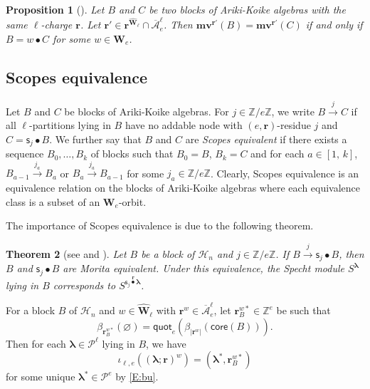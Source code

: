 \documentclass[11pt,a4paper,reqno]{amsart}
\numberwithin{equation}{section}
\theoremstyle{plain}
\newtheorem{thm}{Theorem}[section]
\newtheorem{prop}[thm]{Proposition}
\theoremstyle{definition}
\theoremstyle{remark}
\numberwithin{equation}{section}
\newcommand{\bl}{\boldsymbol{\lambda}}
\newcommand{\br}{\mathbf{r}}
\newcommand{\core}{\mathsf{core}}
\newcommand{\quot}{\mathsf{quot}}
\newcommand{\mv}{\mathbf{mv}}
\newcommand{\ZZ}{\mathbb{Z}}
\newcommand{\cs}{\mathsf{s}}
\newcommand{\HH}{\mathcal{H}}
\newcommand{\PP}{\mathcal{P}}
\newcommand{\EW}{\widehat{\mathbf{W}}}
\newcommand{\AW}{\mathbf{W}}
\newcommand{\DDot}[1]{\mathrel{\overset{#1}{\bullet}}}
\newcommand{\AAbar}{\overline{\mathcal{A}}_e^{\ell}}
\newcommand{\bij}{\iota}
\newcommand{\EP}{\pmb{\varnothing}}
\def\Z{{\mathbb Z}}
\begin{document}
\begin{prop}[{\cite[Proposition 3.13]{LQT}}] \label{P:moving-vector-Weyl-orbit}
Let $B$ and $C$ be two blocks of Ariki-Koike algebras with the same $\ell$-charge $\br$.
Let $\br' \in \br^{\EW_{\ell}} \cap \AAbar$.
Then $\mv^{\br'}(B) = \mv^{\br'}(C)$ if and only if $B = w \DDot{} C$ for some $w \in \AW_e$.
\end{prop}

\subsection{Scopes equivalence}

Let $B$ and $C$ be blocks of Ariki-Koike algebras.
For $j \in \ZZ/e\ZZ$,
we write  $B \xrightarrow{j} C$ if all $\ell$-partitions lying in $B$ have no addable node with $(e,\br)$-residue $j$ and $C = \cs_j \DDot{} B$.
We further say that $B$ and $C$ are {\em Scopes equivalent} if there exists a sequence $B_0,\dotsc, B_k$ of blocks such that 
$B_0= B$, $B_k = C$ and for each $a \in [1,\, k]$, $B_{a-1} \xrightarrow{j_a} B_a$ or $B_{a} \xrightarrow{j_a} B_{a-1}$ for some $j_a \in \ZZ/e\ZZ$.
Clearly, Scopes equivalence is an equivalence relation on the blocks of Ariki-Koike algebras where each equivalence class is a subset of an $\AW_e$-orbit.


The importance of Scopes equivalence is due to the following theorem.%

\begin{thm}[see {\cite[Theorem 6.4]{CR}} and {\cite[Lemma 3.1]{Webster}}] \label{T:CR}
Let $B$ be a block of $\HH_n$ and $j \in \Z/e\Z$.  %
If $B \xrightarrow{j} \cs_j \DDot{} B$, then $B$ and $\cs_j \DDot{} B$ are Morita equivalent. Under this equivalence, the Specht module $S^{\bl}$ lying in $B$ corresponds to $S^{\cs_j \DDot{\br} \bl}$.
\end{thm}


For a block $B$ of $\HH_n$ and $w \in \EW_{\ell}$ with $\br^w \in \AAbar$, let $\br^{w*}_B \in \ZZ^e$ be such that
\begin{equation*}
\beta_{\br^{w*}_B}(\EP) = \quot_e(\beta_{|\br^w|}(\core(B))). \label{E:multicharge-of-dual-block}
\end{equation*}
Then for each $\bl \in\PP^{\ell}$ lying in $B$, we have
$$
\bij_{\ell,e}((\bl;\br)^w) = (\bl^*,\br^{w*}_B)
$$
for some unique $\bl^* \in\PP^e$ by \eqref{E:bu}.
\end{document}

